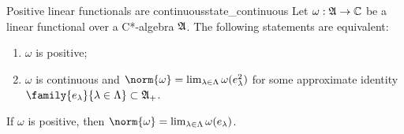 \begin{proposition}{Positive linear functionals are continuous}{state_continuous}
    Let \(\omega : \mathfrak{A} \to \mathbb{C}\) be a linear functional over a C*-algebra \(\mathfrak{A}\). The following statements are equivalent:
    \begin{enumerate}[label=(\alph*)]
        \item \(\omega\) is positive;
        \item \(\omega\) is continuous and \(\norm{\omega} = \lim_{\lambda\in\Lambda} \omega(e_{\lambda}^2)\) for some approximate identity \(\family{e_{\lambda}}{\lambda \in \Lambda} \subset \algebra{A}_+\).
    \end{enumerate}
    If \(\omega\) is positive, then \(\norm{\omega} = \lim_{\lambda \in \Lambda}{\omega(e_\lambda)}\).
\end{proposition}
